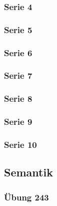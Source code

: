 \documentclass[
  a4paper,
  11pt,
]{scrartcl}
\begin{document}



\subsubsection{Serie 4}
\label{sub:serie_4}




\subsubsection{Serie 5}
\label{sub:serie_5}




\subsubsection{Serie 6}
\label{sub:serie_6}




\subsubsection{Serie 7}
\label{sub:serie_7}




\subsubsection{Serie 8}
\label{sub:serie_8}




\subsubsection{Serie 9}
\label{sub:serie_9}




\subsubsection{Serie 10}
\label{sub:serie_10}



\subsection{Semantik}
\label{sec:semantik}

\subsubsection{Übung 243}
\label{ssub:Uebung 243}
\end{document}
